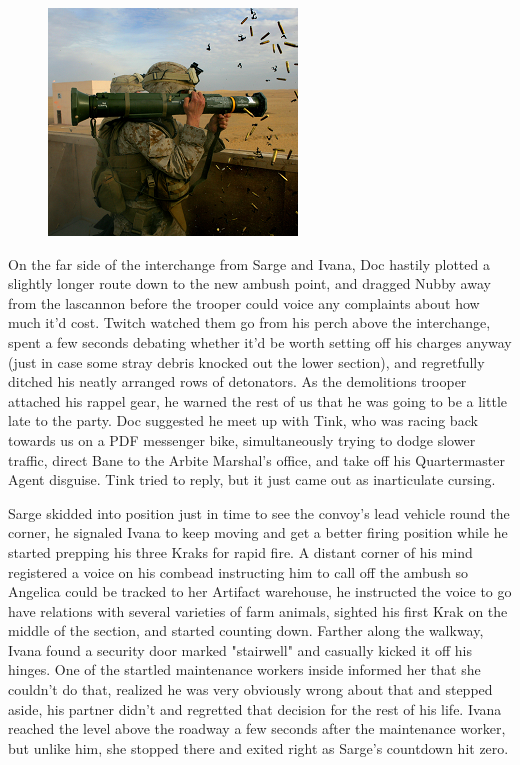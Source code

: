 \begin{figure}
	\begin{center}
		\includegraphics[width=\figwidth]{pics/19/39.png}
	\end{center}
\end{figure}
On the far side of the interchange from Sarge and Ivana, Doc hastily plotted a slightly longer route down to the new ambush point, and dragged Nubby away from the lascannon before the trooper could voice any complaints about how much it'd cost. 
Twitch watched them go from his perch above the interchange, spent a few seconds debating whether it'd be worth setting off his charges anyway (just in case some stray debris knocked out the lower section), and regretfully ditched his neatly arranged rows of detonators. 
As the demolitions trooper attached his rappel gear, he warned the rest of us that he was going to be a little late to the party. 
Doc suggested he meet up with Tink, who was racing back towards us on a PDF messenger bike, simultaneously trying to dodge slower traffic, direct Bane to the Arbite Marshal's office, and take off his Quartermaster Agent disguise. 
Tink tried to reply, but it just came out as inarticulate cursing.

Sarge skidded into position just in time to see the convoy's lead vehicle round the corner, he signaled Ivana to keep moving and get a better firing position while he started prepping his three Kraks for rapid fire. 
A distant corner of his mind registered a voice on his combead instructing him to call off the ambush so Angelica could be tracked to her Artifact warehouse, he instructed the voice to go have relations with several varieties of farm animals, sighted his first Krak on the middle of the section, and started counting down. 
Farther along the walkway, Ivana found a security door marked "stairwell" and casually kicked it off his hinges. 
One of the startled maintenance workers inside informed her that she couldn't do that, realized he was very obviously wrong about that and stepped aside, his partner didn't and regretted that decision for the rest of his life. 
Ivana reached the level above the roadway a few seconds after the maintenance worker, but unlike him, she stopped there and exited right as Sarge's countdown hit zero.

